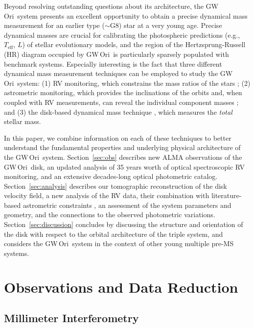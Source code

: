 \documentclass[twocolumn]{aastex61}
\newcommand{\obj}{GW\,Ori}
\begin{document}
Beyond resolving outstanding questions about its architecture, the \obj\ system presents an excellent opportunity to obtain a precise dynamical mass measurement for an earlier type ($\sim$G8) star at a very young age. Precise dynamical masses are crucial for calibrating the photospheric predictions (e.g., $T_\mathrm{eff}$, $L$) of stellar evolutionary models, and the region of the Hertzsprung-Russell (HR) diagram occupied by \obj\ is particularly sparsely populated with benchmark systems. Especially interesting is the fact that three different dynamical mass measurement techniques can be employed to study the \obj\ system: (1) RV monitoring, which constrains the mass ratios of the stars \citep{mathieu91,fang14}; (2) astrometric monitoring, which provides the inclinations of the orbits and, when coupled with RV measurements, can reveal the individual component masses \citep{berger11}; and (3) the disk-based dynamical mass technique \citep[e.g.,][]{simon00,simon17,rosenfeld12b,czekala15a,czekala16}, which measures the {\it total} stellar mass.

In this paper, we combine information on each of these techniques to better understand the fundamental properties and underlying physical architecture of the \obj\ system.  Section~\ref{sec:obs} describes new ALMA observations of the \obj\ disk, an updated analysis of 35 years worth of optical spectroscopic RV monitoring, and an extensive decades-long optical photometric catalog.  Section~\ref{sec:analysis} describes our tomographic reconstruction of the disk velocity field, a new analysis of the RV data, their combination with literature-based astrometric constraints \citep{berger11}, an assessment of the system parameters and geometry, and the connections to the observed photometric variations. Section~\ref{sec:discussion} concludes by discussing the structure and orientation of the disk with respect to the orbital architecture of the triple system, and considers the \obj\ system in the context of other young multiple pre-MS systems.  




\section{Observations and Data Reduction \label{sec:obs}}


\subsection{Millimeter Interferometry}
\end{document}
